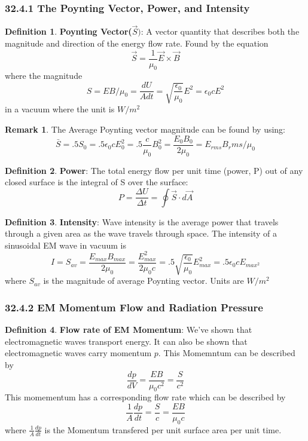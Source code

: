 \documentclass[12pt]{amsart}
\theoremstyle{definition}
\newtheorem{definition}{Definition} %
\newtheorem*{remark}{Remark}        %
\numberwithin{equation}{theorem}    %
\begin{document}
\subsubsection*{32.4.1 The Poynting Vector, Power, and Intensity}
\begin{definition}
    \textbf{Poynting Vector($\vec{S})$}:
    A vector quantity that describes both the magnitude and direction of the energy flow rate. Found by the equation
    $$\vec{S}=\frac{1}{\mu_0}\vec{E}\times\vec{B}$$ where the magnitude $$S = EB/\mu_0 =\frac{dU}{Adt} =\sqrt{\frac{\epsilon_0}{\mu_0}}E^2 = \epsilon_0cE^2$$ in a vacuum where the unit is $W/m^2$ 
    \begin{remark}
    The Average Poynting vector magnitude can be found by using:
    $$\bar{S} = .5S_0 = .5\epsilon_0cE_0^2 = .5\frac{c}{\mu_0}B_0^2=\frac{E_0B_0}{2\mu_0} = E_{rms}{B_rms}/\mu_0$$
    \end{remark}
\end{definition}

\begin{definition}
    \textbf{Power}:
    The total energy flow per unit time (power, P) out of any closed surface is the integral of S over the surface:
    $$P = \frac{\Delta U}{\Delta t} = \oint\vec{S}\cdot d\vec{A} $$
\end{definition}

\begin{definition}
    \textbf{Intensity}:
    Wave intensity is the average power that travels through a given area as the wave travels through space. The intensity of a sinusoidal EM wave in vacuum is 
    $$I = S_{av} = \frac{E_{max}B_{max}}{2\mu_0} = \frac{E_{max}^2}{2\mu_0c} = .5\sqrt{\frac{\epsilon_0}{\mu_0}}E_{max}^2 = 
    .5\epsilon_0cE_{max{^2}}$$ where $S_{av}$ is the magnitude of average Poynting vector. Units are $W/m^2$
\end{definition}

\subsubsection*{32.4.2 EM Momentum Flow and Radiation Pressure}

\begin{definition}
    \textbf{Flow rate of EM Momentum}:
    We’ve shown that electromagnetic waves transport energy. It can also be shown that electromagnetic waves carry momentum $p$. This Momemntum can be described by $$\frac{dp}{dV} = \frac{EB}{\mu_0c^2} = \frac{S}{c^2}$$ This momementum has a corresponding flow rate which can be described by 
    $$\frac{1}{A}\frac{dp}{dt} = \frac{S}{c} = \frac{EB}{\mu_0c}$$ where $\frac{1}{A}\frac{dp}{dt} $ is the Momentum transfered per unit surface area per unit time.
\end{definition}
\end{document}
